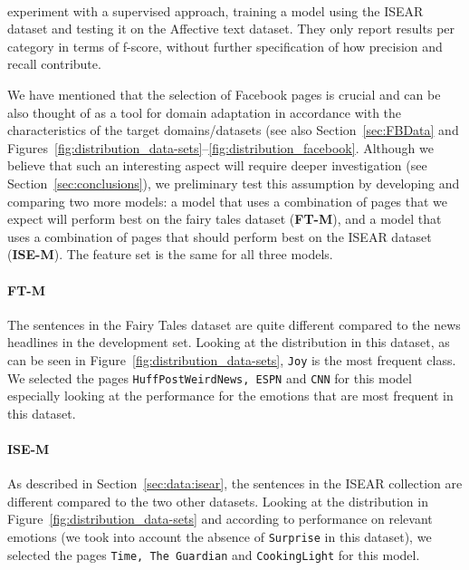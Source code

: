 \documentclass[11pt]{article}
\begin{document}
\paragraph{} experiment with a supervised approach, training a model using the ISEAR dataset and testing it on the Affective text dataset. They only report results per category in terms of f-score, without further specification of how precision and recall contribute.

\bigskip

We have mentioned that the selection of Facebook pages is crucial and can be also thought of as a tool for domain adaptation in accordance with the characteristics of the target domains/datasets (see also Section~\ref{sec:FBData} and Figures~\ref{fig:distribution_data-sets}--\ref{fig:distribution_facebook}. Although we believe that such an interesting aspect will require deeper investigation (see Section~\ref{sec:conclusions}), we preliminary test this assumption by developing and comparing two more models: a model that uses a combination of pages that we expect will perform best on the fairy tales dataset (\textbf{FT-M}), and a model that uses a combination of pages that should perform best on the ISEAR dataset (\textbf{ISE-M}). The feature set is the same for all three models.



\paragraph{FT-M}
The sentences in the Fairy Tales dataset are quite different compared to the news headlines in the development set. Looking at the distribution in this dataset, as can be seen in Figure~\ref{fig:distribution_data-sets}, \texttt{Joy} is the most frequent class. We selected the pages \texttt{HuffPostWeirdNews, ESPN} and \texttt{CNN} for this model especially looking at the performance for the emotions that are most frequent in this dataset.



\paragraph{ISE-M}
As described in Section~\ref{sec:data:isear}, the sentences in the ISEAR collection are different compared to the two other datasets. Looking at the distribution in Figure~\ref{fig:distribution_data-sets} and according to performance on relevant emotions (we took into account the absence of \texttt{Surprise} in this dataset), we selected the pages \texttt{Time, The Guardian} and \texttt{CookingLight} for this model. 
\end{document}

